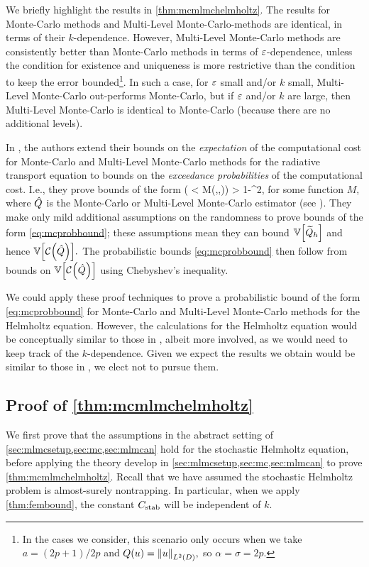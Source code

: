 We briefly highlight the results in \cref{thm:mcmlmchelmholtz}. The results for Monte-Carlo methods and Multi-Level Monte-Carlo-methods are identical, in terms of their $k$-dependence. However, Multi-Level Monte-Carlo methods are consistently better than Monte-Carlo methods in terms of $\varepsilon$-dependence, unless the condition for existence and uniqueness is more restrictive than the condition to keep the error bounded\footnote{In the cases we consider, this scenario only occurs when we take $a = (2p+1)/2p$ and $Q(u) = \NLtD{u},$ so $\alpha = \sigma = 2p.$}. In such a case, for $\varepsilon$ small and/or $k$ small, Multi-Level Monte-Carlo out-performs Monte-Carlo, but if $\varepsilon$ and/or $k$ are large, then Multi-Level Monte-Carlo is identical to Monte-Carlo (because there are no additional levels).


In \cite{GrPaSc:19}, the authors extend their bounds on the \emph{expectation} of the computational cost for Monte-Carlo and Multi-Level Monte-Carlo methods for the radiative transport equation to bounds on the \emph{exceedance probabilities} of the computational cost. I.e., they prove bounds of the form
\beq\label{eq:mcprobbound}
\PP\mleft(\Cost{\Qhat} < M(\eps,\delta,\Qhat)\mright) > 1-\delta^2,
\eeq
for some function $M$, where $\hat{Q}$ is the Monte-Carlo or Multi-Level Monte-Carlo estimator (see \cite[Theorems 5.12 and 5.13]{GrPaSc:19}). They make only mild additional assumptions on the randomness to prove bounds of the form \cref{eq:mcprobbound}; these assumptions mean they can bound $\VAR{\Qhtilde}$ and hence $\VAR{\Cost{\Qhat}}.$ The probabilistic bounds \cref{eq:mcprobbound} then follow from bounds on $\VAR{\Cost{\Qhat}}$ using Chebyshev's inequality.

We could apply these proof techniques to prove a probabilistic bound of the form \cref{eq:mcprobbound} for Monte-Carlo and Multi-Level Monte-Carlo methods for the Helmholtz equation. However, the calculations for the Helmholtz equation would be conceptually similar to those in \cite{GrPaSc:19}, albeit more involved, as we would need to keep track of the $k$-dependence. Given we expect the results we obtain would be similar to those in \cite{GrPaSc:19}, we elect not to pursue them.
\ere
\subsection{Proof of \cref{thm:mcmlmchelmholtz}}
We first prove that the assumptions in the abstract setting of \cref{sec:mlmcsetup,sec:mc,sec:mlmcan} hold for the stochastic Helmholtz equation, before applying the theory develop in \cref{sec:mlmcsetup,sec:mc,sec:mlmcan} to prove \cref{thm:mcmlmchelmholtz}. Recall that we have assumed the stochastic Helmholtz problem is almost-surely nontrapping. In particular, when we apply \cref{thm:fembound}, the constant $C_{\mathrm{stab}}$ will be independent of $k.$

